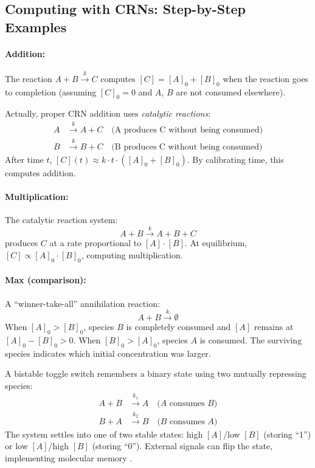 \subsection{Computing with CRNs: Step-by-Step Examples}

\paragraph{Addition:} The reaction $A + B \xrightarrow{k} C$ computes $[C] = [A]_0 + [B]_0$ when the reaction goes to completion (assuming $[C]_0 = 0$ and $A$, $B$ are not consumed elsewhere).

Actually, proper CRN addition uses \emph{catalytic reactions}:
\begin{align}
A &\xrightarrow{k} A + C \quad \text{(A produces C without being consumed)} \\
B &\xrightarrow{k} B + C \quad \text{(B produces C without being consumed)}
\end{align}
After time $t$, $[C](t) \approx k \cdot t \cdot ([A]_0 + [B]_0)$. By calibrating time, this computes addition.

\paragraph{Multiplication:} The catalytic reaction system:
\begin{equation}
A + B \xrightarrow{k} A + B + C
\end{equation}
produces $C$ at a rate proportional to $[A] \cdot [B]$. At equilibrium, $[C] \propto [A]_0 \cdot [B]_0$, computing multiplication.

\paragraph{Max (comparison):} A ``winner-take-all'' annihilation reaction:
\begin{equation}
A + B \xrightarrow{k} \emptyset
\end{equation}
When $[A]_0 > [B]_0$, species $B$ is completely consumed and $[A]$ remains at $[A]_0 - [B]_0 > 0$. When $[B]_0 > [A]_0$, species $A$ is consumed. The surviving species indicates which initial concentration was larger.

\begin{example}
A bistable toggle switch remembers a binary state using two mutually repressing species:
\begin{align}
A + B &\xrightarrow{k_1} A \quad \text{($A$ consumes $B$)} \\
B + A &\xrightarrow{k_2} B \quad \text{($B$ consumes $A$)}
\end{align}
The system settles into one of two stable states: high $[A]$/low $[B]$ (storing ``1'') or low $[A]$/high $[B]$ (storing ``0''). External signals can flip the state, implementing molecular memory \citep{gardner2000}.
\end{example}

